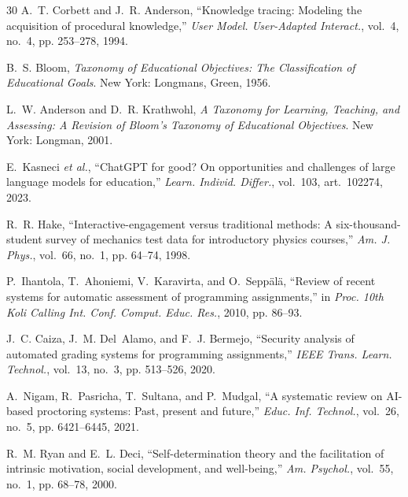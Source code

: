 \documentclass[journal]{IEEEtran}
\begin{document}
\begin{thebibliography}{30}
A.~T. Corbett and J.~R. Anderson, ``Knowledge tracing: Modeling the acquisition of procedural knowledge,'' \emph{User Model. User-Adapted Interact.}, vol.~4, no.~4, pp. 253--278, 1994.

B.~S. Bloom, \emph{Taxonomy of Educational Objectives: The Classification of Educational Goals}. New York: Longmans, Green, 1956.

L.~W. Anderson and D.~R. Krathwohl, \emph{A Taxonomy for Learning, Teaching, and Assessing: A Revision of Bloom's Taxonomy of Educational Objectives}. New York: Longman, 2001.

E.~Kasneci \emph{et al.}, ``ChatGPT for good? On opportunities and challenges of large language models for education,'' \emph{Learn. Individ. Differ.}, vol.~103, art.~102274, 2023.

R.~R. Hake, ``Interactive-engagement versus traditional methods: A six-thousand-student survey of mechanics test data for introductory physics courses,'' \emph{Am. J. Phys.}, vol.~66, no.~1, pp. 64--74, 1998.

P.~Ihantola, T.~Ahoniemi, V.~Karavirta, and O.~Sepp\"{a}l\"{a}, ``Review of recent systems for automatic assessment of programming assignments,'' in \emph{Proc. 10th Koli Calling Int. Conf. Comput. Educ. Res.}, 2010, pp. 86--93.

J.~C. Caiza, J.~M. Del~Alamo, and F.~J. Bermejo, ``Security analysis of automated grading systems for programming assignments,'' \emph{IEEE Trans. Learn. Technol.}, vol.~13, no.~3, pp. 513--526, 2020.

A.~Nigam, R.~Pasricha, T.~Sultana, and P.~Mudgal, ``A systematic review on AI-based proctoring systems: Past, present and future,'' \emph{Educ. Inf. Technol.}, vol.~26, no.~5, pp. 6421--6445, 2021.

R.~M. Ryan and E.~L. Deci, ``Self-determination theory and the facilitation of intrinsic motivation, social development, and well-being,'' \emph{Am. Psychol.}, vol.~55, no.~1, pp. 68--78, 2000.
\end{thebibliography}
\end{document}
